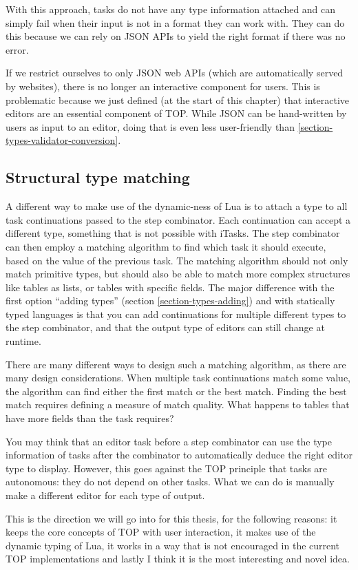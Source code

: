 With this approach, tasks do not have any type information attached and can simply fail when their input is not in a format they can work with. They can do this because we can rely on JSON APIs to yield the right format if there was no error.

If we restrict ourselves to only JSON web APIs (which are automatically served by websites), there is no longer an interactive component for users. This is problematic because we just defined (at the start of this chapter) that interactive editors are an essential component of TOP. While JSON can be hand-written by users as input to an editor, doing that is even less user-friendly than \ref{section-types-validator-conversion}.

\subsection{Structural type matching}\label{section-types-matching}
A different way to make use of the dynamic-ness of Lua is to attach a type to all task continuations passed to the step combinator. Each continuation can accept a different type, something that is not possible with iTasks.
The step combinator can then employ a matching algorithm to find which task it should execute, based on the value of the previous task.
The matching algorithm should not only match primitive types, but should also be able to match more complex structures like tables as lists, or tables with specific fields. The major difference with the first option ``adding types'' (section \ref{section-types-adding}) and with statically typed languages is that you can add continuations for multiple different types to the step combinator, and that the output type of editors can still change at runtime.

There are many different ways to design such a matching algorithm, as there are many design considerations. When multiple task continuations match some value, the algorithm can find either the first match or the best match. Finding the best match requires defining a measure of match quality. What happens to tables that have more fields than the task requires?

You may think that an editor task before a step combinator can use the type information of tasks after the combinator to automatically deduce the right editor type to display. However, this goes against the TOP principle that tasks are autonomous: they do not depend on other tasks. What we can do is manually make a different editor for each type of output.

This is the direction we will go into for this thesis, for the following reasons:
it keeps the core concepts of TOP with user interaction,
it makes use of the dynamic typing of Lua,
it works in a way that is not encouraged in the current TOP implementations
and lastly I think it is the most interesting and novel idea.
